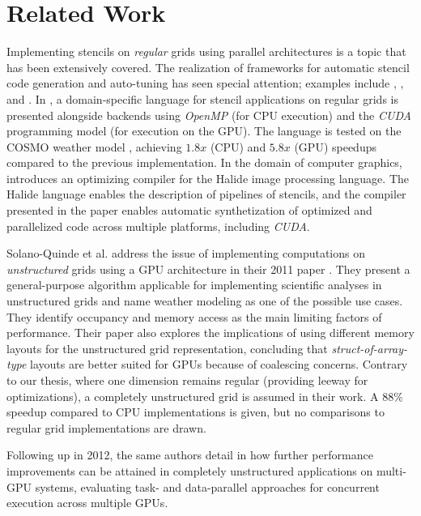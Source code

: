\chapter{Related Work}

Implementing stencils on \emph{regular} grids using parallel architectures is a topic that has been extensively covered. The realization of frameworks for automatic stencil code generation and auto-tuning has seen special attention; examples include \cite{kamil2010auto}, \cite{christen2011patus}, and \cite{maruyama2011physis}. In \cite{gysi2015stella}, a domain-specific language for stencil applications on regular grids is presented alongside backends using \emph{OpenMP} (for CPU execution) and the \emph{CUDA} programming model (for execution on the GPU). The language is tested on the COSMO weather model \cite{cosmo}, achieving $1.8x$ (CPU) and $5.8x$ (GPU) speedups compared to the previous implementation. In the domain of computer graphics, \cite{ragan2013halide} introduces an optimizing compiler for the Halide image processing language. The Halide language enables the description of pipelines of stencils, and the compiler presented in the paper enables automatic synthetization of optimized and parallelized code across multiple platforms, including \emph{CUDA}.

Solano-Quinde et al. address the issue of implementing computations on \emph{unstructured} grids using a GPU architecture in their 2011 paper \cite{solano2011}. They present a general-purpose algorithm applicable for implementing scientific analyses in unstructured grids and name weather modeling as one of the possible use cases. They identify occupancy and memory access as the main limiting factors of performance. Their paper also explores the implications of using different memory layouts for the unstructured grid representation, concluding that \emph{struct-of-array-type} layouts are better suited for GPUs because of coalescing concerns. Contrary to our thesis, where one dimension remains regular (providing leeway for optimizations), a completely unstructured grid is assumed in their work. A $88\%$ speedup compared to CPU implementations is given, but no comparisons to regular grid implementations are drawn.

Following up in 2012, the same authors detail in \cite{solano2012} how further performance improvements can be attained in completely unstructured applications on multi-GPU systems, evaluating task- and data-parallel approaches for concurrent execution across multiple GPUs.

